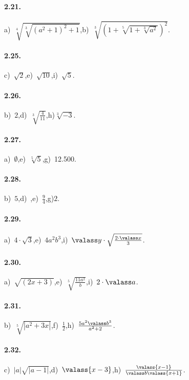 \paragraph{2.21.}
a)~$\sqrt[4]{\sqrt[3]{(a^2+1)^2+1}}$,\quad b)~$\sqrt[3]{\left(1+\sqrt[5]{1+\sqrt[3]{a^2}}\right)^2}$.

\begin{multicols}{2}
\paragraph{2.25.}
c)~$\sqrt 2$,\quad e)~$\sqrt{10}$,\quad i)~$\sqrt 5$.

\paragraph{2.26.}
b)~$2$,\quad d)~$\sqrt[3]{\frac 4{11}}$,\quad h)$\sqrt[3]{-3}$.

\paragraph{2.27.}
a)~$\emptyset$,\quad e)~$\sqrt[5]5$,\quad g)~12.500.

\paragraph{2.28.}
b)~$5$,\quad d)~,\quad e)~$\frac 9 4$,\quad g)$2$.

\paragraph{2.29.}
a)~$4\cdot \sqrt 3$,\quad e)~$4a^2b^3$,\quad i)~$\valass y \cdot \sqrt{\frac{2\cdot \valass x} 3}$.

\paragraph{2.30.}
a)~$\sqrt{(2x+3)}$,\quad e)~$\sqrt[5]{\frac{11a^2} b}$,\quad i)~$2\cdot \valass a$.

\paragraph{2.31.}
b)~$\sqrt[5]{\left|a^2+3x\right|}$,\quad f)~$\frac 1 2$,\quad h)~$\frac{5a^2\valass b^3}{a^2+2}$.

\paragraph{2.32.}
c)~$\left|a\right|\sqrt{\left|a-1\right|}$,\quad d)~$\valass{x-3}$,\quad h)~$\frac{\valass{x-1}}{\valass b \valass{x+1}}$.
\end{multicols}

